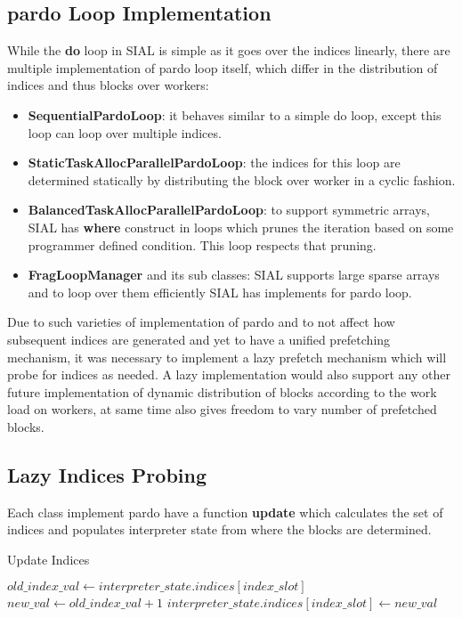 \subsection{pardo Loop Implementation}
While the \textbf{do} loop in SIAL is simple as it goes over the indices
linearly, there are multiple implementation of pardo loop itself, which differ
in the distribution of indices and thus blocks over workers:
\begin{itemize}
\item \textbf{SequentialPardoLoop}: it behaves similar to a simple do loop,
  except this loop can loop over multiple indices.
\item \textbf{StaticTaskAllocParallelPardoLoop}: the indices for this loop are
  determined statically by distributing the block over worker in a cyclic fashion.
\item \textbf{BalancedTaskAllocParallelPardoLoop}: to support symmetric arrays,
  SIAL has \textbf{where} construct in loops which prunes the iteration based on
  some programmer defined condition. This loop respects that pruning.
\item \textbf{FragLoopManager} and its sub classes: SIAL supports large sparse
  arrays and to loop over them efficiently SIAL has implements for pardo loop.
\end{itemize}
Due to such varieties of implementation of pardo and to not affect how
subsequent indices are generated and yet to have a unified prefetching
mechanism, it was necessary to implement a lazy prefetch mechanism which will
probe for indices as needed. A lazy implementation would also support any other
future implementation of dynamic distribution of blocks according to the work
load on workers, at same time also gives freedom to vary number of prefetched
blocks.

\subsection{Lazy Indices Probing}
Each class implement pardo have a function \textbf{update} which calculates the
set of indices and populates interpreter state from where the blocks are
determined.

\begin{algorithm}  {Update Indices}
\singlespacing

\begin{algorithmic}[1]
\State $old\_index\_val \gets
interpreter\_state.indices[index\_slot]$
\State $new\_val \gets old\_index\_val + 1$
\State $interpreter\_state.indices[index\_slot] \gets new\_val$
\EndFor
\EndProcedure
\end{algorithmic}
\end{algorithm}


